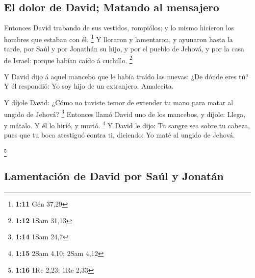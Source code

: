 \hypertarget{el-dolor-de-david-matando-al-mensajero}{%
\subsection{El dolor de David; Matando al
mensajero}\label{el-dolor-de-david-matando-al-mensajero}}

 Entonces David trabando de sus vestidos, rompiólos; y lo
mismo hicieron los hombres que estaban con él. \footnote{\textbf{1:11}
  Gén 37,29}  Y lloraron y lamentaron, y ayunaron hasta
la tarde, por Saúl y por Jonathán su hijo, y por el pueblo de Jehová, y
por la casa de Israel: porque habían caído á cuchillo. \footnote{\textbf{1:12}
  1Sam 31,13}

 Y David dijo á aquel mancebo que le había traído las
nuevas: ¿De dónde eres tú? Y él respondió: Yo soy hijo de un extranjero,
Amalecita.

 Y díjole David: ¿Cómo no tuviste temor de extender tu
mano para matar al ungido de Jehová? \footnote{\textbf{1:14} 1Sam 24,7}
 Entonces llamó David uno de los mancebos, y díjole:
Llega, y mátalo. Y él lo hirió, y murió. \footnote{\textbf{1:15} 2Sam
  4,10; 2Sam 4,12}  Y David le dijo: Tu sangre sea sobre
tu cabeza, pues que tu boca atestiguó contra ti, diciendo: Yo maté al
ungido de Jehová.

\footnote{\textbf{1:16} 1Re 2,23; 1Re 2,33}

\hypertarget{lamentaciuxf3n-de-david-por-sauxfal-y-jonatuxe1n}{%
\subsection{Lamentación de David por Saúl y
Jonatán}\label{lamentaciuxf3n-de-david-por-sauxfal-y-jonatuxe1n}}

